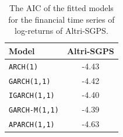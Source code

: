 \documentclass{article}
\begin{document}
  \begin{table}[ht!]
    \centering
    \begin{tabular}{|l|c|}
      \hline
      \textbf{Model} 
      & \textbf{Altri-SGPS} 
     \\ \hline
      \verb|ARCH(1)|&  -4.43 \\ \hline 
      \verb|GARCH(1,1)|  & -4.42  \\ \hline
      \verb|IGARCH(1,1)|  &  -4.40 \\ \hline
      \verb|GARCH-M(1,1)|  &  -4.39 \\ \hline
      \verb|APARCH(1,1)|  & -4.63  \\  \hline
    \end{tabular}
    \caption{The AIC of the fitted models for the financial time series of log-returns
    of Altri-SGPS.}
    \label{model:Altri-SGPS}
  \end{table}


\newpage
\end{document}
